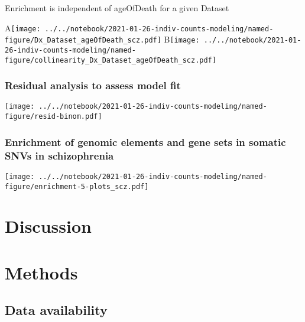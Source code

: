 \documentclass[letterpaper]{article}
\begin{document}
Enrichment is independent of ageOfDeath for a given Dataset

A\texttt{[image: ../../notebook/2021-01-26-indiv-counts-modeling/named-figure/Dx\_Dataset\_ageOfDeath\_scz.pdf]}
B\texttt{[image: ../../notebook/2021-01-26-indiv-counts-modeling/named-figure/collinearity\_Dx\_Dataset\_ageOfDeath\_scz.pdf]}

\subsubsection*{Residual analysis to assess model fit }

\texttt{[image: ../../notebook/2021-01-26-indiv-counts-modeling/named-figure/resid-binom.pdf]}

\subsubsection*{Enrichment of genomic elements and gene sets in somatic SNVs in schizophrenia}

\texttt{[image: ../../notebook/2021-01-26-indiv-counts-modeling/named-figure/enrichment-5-plots\_scz.pdf]}

\section*{Discussion}


\section*{Methods}


\subsection*{Data availability}
\end{document}
